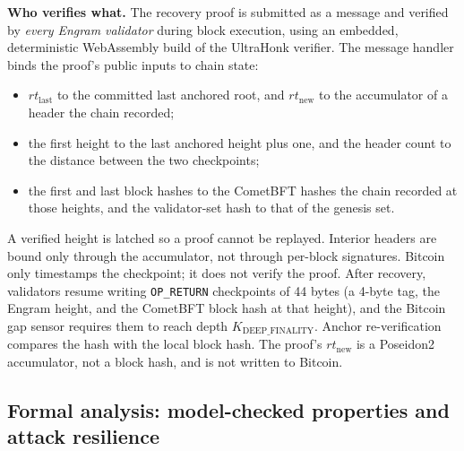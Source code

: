 \textbf{Who verifies what.} The recovery proof is submitted as a message and
verified by \emph{every Engram validator} during block execution, using an
embedded, deterministic WebAssembly build of the UltraHonk verifier. The
message handler binds the proof's public inputs to chain state:
\begin{itemize}
  \item $\mathit{rt}_{\text{last}}$ to the committed last anchored root, and
  $\mathit{rt}_{\text{new}}$ to the accumulator of a header the chain recorded;
  \item the first height to the last anchored height plus one, and the header
  count to the distance between the two checkpoints;
  \item the first and last block hashes to the CometBFT hashes the chain
  recorded at those heights, and the validator-set hash to that of the genesis
  set.
\end{itemize}
A verified height is latched so a proof cannot be replayed. Interior headers
are bound only through the accumulator, not through per-block signatures.
Bitcoin only timestamps the checkpoint; it does not verify the proof. After
recovery, validators resume writing \texttt{OP\_RETURN} checkpoints of 44 bytes
(a 4-byte tag, the Engram height, and the CometBFT block hash at that height),
and the Bitcoin gap sensor requires them to reach depth
$K_{\text{DEEP\_FINALITY}}$. Anchor re-verification compares the hash with the
local block hash. The proof's $\mathit{rt}_{\text{new}}$ is a Poseidon2
accumulator, not a block hash, and is not written to Bitcoin.

\subsection*{Formal analysis: model-checked properties and attack resilience}

\label{subsec:formal-invariants}

